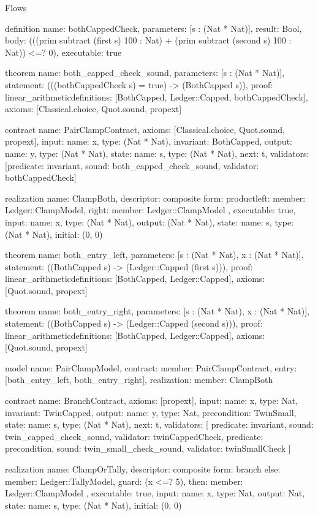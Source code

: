 \begin{lexlean}{Flows}
\begin{semanticmodule}
definition{
  name: bothCappedCheck,
  parameters: [s : (Nat * Nat)],
  result: Bool,
  body: (((prim subtract (first s) 100 : Nat) + (prim subtract (second s) 100 : Nat)) <=? 0),
  executable: true
}

theorem{
  name: both_capped_check_sound,
  parameters: [s : (Nat * Nat)],
  statement: (((bothCappedCheck s) = true) -> (BothCapped s)),
  proof: linear_arithmetic{definitions: [BothCapped, Ledger::Capped, bothCappedCheck]},
  axioms: [Classical.choice, Quot.sound, propext]
}

contract{
  name: PairClampContract,
  axioms: [Classical.choice, Quot.sound, propext],
  input: {name: x, type: (Nat * Nat)},
  invariant: BothCapped,
  output: {name: y, type: (Nat * Nat)},
  state: {name: s, type: (Nat * Nat), next: t},
  validators: [{predicate: invariant, sound: both_capped_check_sound, validator: bothCappedCheck}]
}

realization{
  name: ClampBoth,
  descriptor: composite{
    form: product{left: {member: Ledger::ClampModel}, right: {member: Ledger::ClampModel}}
  },
  executable: true,
  input: {name: x, type: (Nat * Nat)},
  output: (Nat * Nat),
  state: {name: s, type: (Nat * Nat), initial: (0, 0)}
}

theorem{
  name: both_entry_left,
  parameters: [s : (Nat * Nat), x : (Nat * Nat)],
  statement: ((BothCapped s) -> (Ledger::Capped (first s))),
  proof: linear_arithmetic{definitions: [BothCapped, Ledger::Capped]},
  axioms: [Quot.sound, propext]
}

theorem{
  name: both_entry_right,
  parameters: [s : (Nat * Nat), x : (Nat * Nat)],
  statement: ((BothCapped s) -> (Ledger::Capped (second s))),
  proof: linear_arithmetic{definitions: [BothCapped, Ledger::Capped]},
  axioms: [Quot.sound, propext]
}

model{
  name: PairClampModel,
  contract: {member: PairClampContract},
  entry: [both_entry_left, both_entry_right],
  realization: {member: ClampBoth}
}

contract{
  name: BranchContract,
  axioms: [propext],
  input: {name: x, type: Nat},
  invariant: TwinCapped,
  output: {name: y, type: Nat},
  precondition: TwinSmall,
  state: {name: s, type: (Nat * Nat), next: t},
  validators: [
    {predicate: invariant, sound: twin_capped_check_sound, validator: twinCappedCheck},
    {predicate: precondition, sound: twin_small_check_sound, validator: twinSmallCheck}
  ]
}

realization{
  name: ClampOrTally,
  descriptor: composite{
    form: branch{
      else: {member: Ledger::TallyModel},
      guard: (x <=? 5),
      then: {member: Ledger::ClampModel}
    }
  },
  executable: true,
  input: {name: x, type: Nat},
  output: Nat,
  state: {name: s, type: (Nat * Nat), initial: (0, 0)}
}


\end{semanticmodule}
\end{lexlean}
